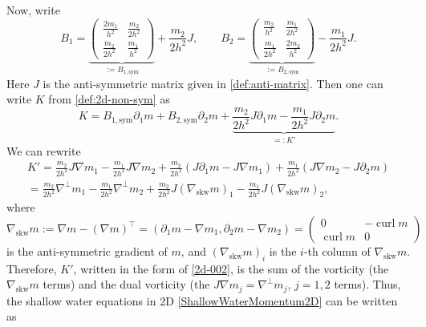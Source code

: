 \documentclass[reqno,11pt]{amsart}
\DeclareMathOperator{\curl}{curl}
\theoremstyle{plain}
\theoremstyle{definition}
\numberwithin{equation}{section}
\begin{document}
Now, write 
\begin{equation}
    \label{2d-001}
    B_1 =  \underbrace{\begin{pmatrix}
        \frac{2m_1}{h^2} & \frac{m_2}{2h^2} \\
        \frac{m_2}{2h^2} & \frac{m_1}{h^2}
    \end{pmatrix}}_{:= B_\mathrm{1,sym}} + \frac{m_2}{2h^2} J, \qquad B_2 =  \underbrace{\begin{pmatrix}
        \frac{m_2}{h^2} & \frac{m_1}{2h^2} \\
        \frac{m_1}{2h^2} & \frac{2m_2}{h^2}
    \end{pmatrix}}_{:= B_\mathrm{2,sym}} - \frac{m_1}{2h^2}J.
\end{equation}
Here $ J $ is the anti-symmetric matrix given in \eqref{def:anti-matrix}.
Then one can write $ K $ from \eqref{def:2d-non-sym} as
\begin{equation}
    \label{2d-K-good-form}
    K = B_\mathrm{1,sym} \partial_1 m + B_\mathrm{2,sym} \partial_2 m + \underbrace{\frac{m_2}{2h^2} J \partial_1 m - \frac{m_1}{2h^2} J \partial_2 m}_{=:K'}.
\end{equation}
We can rewrite
\begin{equation}
    \label{2d-002}
    \begin{gathered}
    K' = \frac{m_2}{2h^2} J \nabla m_1 - \frac{m_1}{2h^2} J \nabla m_2 + \frac{m_2}{2h^2}(J\partial_1 m - J\nabla m_1) + \frac{m_1}{2h^2} (J\nabla m_2 - J\partial_2 m) \\
    = \frac{m_2}{2h^2} \nabla^\perp m_1 - \frac{m_1}{2h^2} \nabla^\perp m_2 + \frac{m_2}{2h^2} J (\nabla_\mathrm{skw}m)_1 - \frac{m_1}{2h^2} J (\nabla_\mathrm{skw}m)_2,
    \end{gathered}
\end{equation}
where 
\begin{equation}
    \label{2d-003}
    \nabla_\mathrm{skw} m := \nabla m - (\nabla m)^\top = (\partial_1 m - \nabla m_1, \partial_2 m - \nabla m_2) = \begin{pmatrix}
        0 & - \curl m \\
        \curl m & 0
    \end{pmatrix}
\end{equation}
is the anti-symmetric gradient of $ m $, and $(\nabla_\mathrm{skw} m)_i $
is the $ i $-th column of $\nabla_{\mathrm{skw}}m$. Therefore, $ K' $, written in the form of \eqref{2d-002}, is the sum of the vorticity (the $\nabla_\mathrm{skw} m$ terms) and the dual vorticity (the $J\nabla m_j = \nabla^\perp m_j$, $ j = 1,2$ terms). Thus, the shallow water equations in 2D \eqref{ShallowWaterMomentum2D} can be written as
\end{document}
